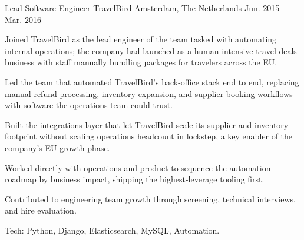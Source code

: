 \begin{cventries}
  \cventry
    {Lead Software Engineer} %
    {\href{https://travelbird.nl/}{TravelBird}} %
    {Amsterdam, The Netherlands} %
    {Jun. 2015 -- Mar. 2016} %
    {
      \begin{cvitems} %
        \item {Joined TravelBird as the lead engineer of the team tasked with automating internal operations; the company had launched as a human-intensive travel-deals business with staff manually bundling packages for travelers across the EU.}
        \item {Led the team that automated TravelBird's back-office stack end to end, replacing manual refund processing, inventory expansion, and supplier-booking workflows with software the operations team could trust.}
        \item {Built the integrations layer that let TravelBird scale its supplier and inventory footprint without scaling operations headcount in lockstep, a key enabler of the company's EU growth phase.}
        \item {Worked directly with operations and product to sequence the automation roadmap by business impact, shipping the highest-leverage tooling first.}
        \item {Contributed to engineering team growth through screening, technical interviews, and hire evaluation.}
        \item {Tech: Python, Django, Elasticsearch, MySQL, Automation.}
      \end{cvitems}
    }


\end{cventries}
